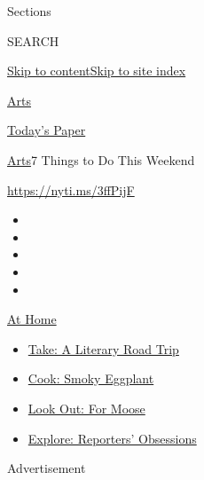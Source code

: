 Sections

SEARCH

\protect\hyperlink{site-content}{Skip to
content}\protect\hyperlink{site-index}{Skip to site index}

\href{https://www.nytimes3xbfgragh.onion/section/arts}{Arts}

\href{https://myaccount.nytimes3xbfgragh.onion/auth/login?response_type=cookie\&client_id=vi}{}

\href{https://www.nytimes3xbfgragh.onion/section/todayspaper}{Today's
Paper}

\href{/section/arts}{Arts}\textbar{}7 Things to Do This Weekend

\url{https://nyti.ms/3ffPijF}

\begin{itemize}
\item
\item
\item
\item
\item
\end{itemize}

\href{https://www.nytimes3xbfgragh.onion/spotlight/at-home?action=click\&pgtype=Article\&state=default\&region=TOP_BANNER\&context=at_home_menu}{At
Home}

\begin{itemize}
\tightlist
\item
  \href{https://www.nytimes3xbfgragh.onion/2020/07/28/books/time-for-a-literary-road-trip.html?action=click\&pgtype=Article\&state=default\&region=TOP_BANNER\&context=at_home_menu}{Take:
  A Literary Road Trip}
\item
  \href{https://www.nytimes3xbfgragh.onion/2020/07/29/magazine/bored-with-your-home-cooking-some-smoky-eggplant-will-fix-that.html?action=click\&pgtype=Article\&state=default\&region=TOP_BANNER\&context=at_home_menu}{Cook:
  Smoky Eggplant}
\item
  \href{https://www.nytimes3xbfgragh.onion/2020/07/27/travel/moose-michigan-isle-royale.html?action=click\&pgtype=Article\&state=default\&region=TOP_BANNER\&context=at_home_menu}{Look
  Out: For Moose}
\item
  \href{https://www.nytimes3xbfgragh.onion/interactive/2020/at-home/even-more-reporters-editors-diaries-lists-recommendations.html?action=click\&pgtype=Article\&state=default\&region=TOP_BANNER\&context=at_home_menu}{Explore:
  Reporters' Obsessions}
\end{itemize}

Advertisement


